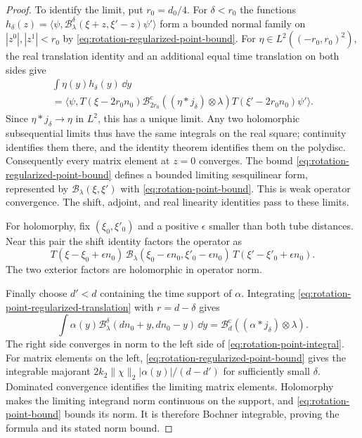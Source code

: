 \begin{proof}
To identify the limit, put $r_0=d_0/4$.
For $\delta<r_0$ the functions
$h_\delta(z)=\langle\psi,\mathcal B_\lambda^\delta
(\xi+z,\xi'-z)\psi'\rangle$ form a bounded normal family on
$|z^0|,|z^1|<r_0$ by
\eqref{eq:rotation-regularized-point-bound}.
For $\eta\in L^2((-r_0,r_0)^2)$, the real translation identity
and an additional equal time translation on both sides give
\begin{multline}\label{eq:rotation-point-limit-test}
 \int\eta(y)h_\delta(y)\,\dd y\\
 =\langle\psi,T(\xi-2r_0n_0)
       \mathcal B_{2r_0}^{\mathrm c}((\eta*j_\delta)\otimes\lambda)
       T(\xi'-2r_0n_0)\psi'\rangle.
\end{multline}
Since $\eta*j_\delta\to\eta$ in $L^2$, this has a unique limit.
Any two holomorphic subsequential limits thus have the same
integrals on the real square; continuity identifies them there,
and the identity theorem identifies them on the polydisc.
Consequently every matrix element at $z=0$ converges.
The bound \eqref{eq:rotation-regularized-point-bound} defines a
bounded limiting sesquilinear form, represented by
$\mathcal B_\lambda(\xi,\xi')$ with
\eqref{eq:rotation-point-bound}. This is weak operator convergence.
The shift, adjoint, and real linearity identities pass to these
limits.

For holomorphy, fix $(\xi_0,\xi'_0)$ and a positive $\epsilon$
smaller than both tube distances. Near this pair the shift identity
factors the operator as
\[
 T(\xi-\xi_0+\epsilon n_0)\,
 \mathcal B_\lambda(\xi_0-\epsilon n_0,\xi'_0-\epsilon n_0)\,
 T(\xi'-\xi'_0+\epsilon n_0).
\]
The two exterior factors are holomorphic in operator norm.

Finally choose $d'<d$ containing the time support of $\alpha$.
Integrating
\eqref{eq:rotation-point-regularized-translation} with $r=d-\delta$
gives
\[
 \int\alpha(y)\mathcal B_\lambda^\delta(dn_0+y,dn_0-y)\,\dd y
       =\mathcal B_d^{\mathrm c}((\alpha*j_\delta)\otimes\lambda).
\]
The right side converges in norm to the left side of
\eqref{eq:rotation-point-integral}. For matrix elements on the
left, \eqref{eq:rotation-regularized-point-bound} gives the
integrable majorant
$2k_2\|\chi\|_2|\alpha(y)|/(d-d')$ for sufficiently small $\delta$.
Dominated convergence identifies the limiting matrix elements.
Holomorphy makes the limiting integrand norm continuous on the
support, and \eqref{eq:rotation-point-bound} bounds its norm.
It is therefore Bochner integrable, proving the formula and its
stated norm bound.
\end{proof}

